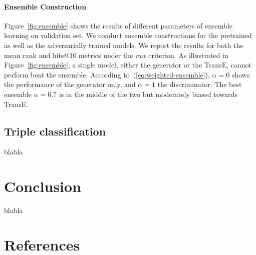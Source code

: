 \documentclass[twocolumn,a4paper,10pt,preprint,3p]{elsarticle}
\begin{document}
\paragraph{Ensemble Construction} Figure~\ref{fig:ensemble} shows the results of different parameters of ensemble learning on validation set. We conduct ensemble constructions for the pretrained as well as the adversarially trained models. We report the results for both the mean rank and hits@10 metrics under the \emph{raw} criterion. As illustrated in Figure~\ref{fig:ensemble}, a single model, either the generator or the TransE, cannot perform beat the ensemble. According to~(\ref{eq:weighted-ensemble}), $\alpha=0$ shows the performance of the generator only, and $\alpha=1$ the discriminator. The best ensemble $\alpha=0.7$ is in the middle of the two but moderately biased towards TransE.  

\subsection{Triple classification}

blabla


\section{Conclusion}

blabla

\section*{References}



\end{document}
